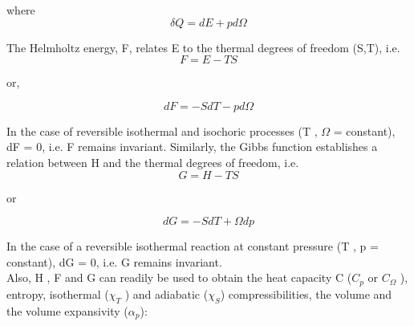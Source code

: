 \documentclass[12pt]{article}
\newcommand*{\1}{\hspace{1pt}}
\begin{document}
    where       \begin{equation*}
                    \delta Q = dE + pd \Omega
                \end{equation*}

    The Helmholtz energy, F, relates E to the thermal degrees of freedom (S,T), i.e.\\

                \begin{equation}
                    F = E - TS
                \end{equation}

    or,

                \begin{equation}
                    dF = -SdT - pd \Omega
                \end{equation}

    In the case of reversible isothermal and isochoric processes (T , $\Omega$ = constant),
    dF = 0, i.e.
    F remains invariant.
        Similarly, the Gibbs function establishes a relation between H and the thermal degrees
    of freedom, i.e.\\

                \begin{equation}
                G = H - TS
                \end{equation}

or

                \begin{equation}
                dG = -S dT + \Omega dp
                \end{equation}

    In the case of a reversible isothermal reaction at constant pressure (T , p = constant),
    dG = 0, i.e. G remains invariant.\\

        Also, H , F and G can readily be used to obtain the heat capacity C ($C_{p}$ or $C_{\Omega}$ ),
    entropy, isothermal ($\chi _{T}$ ) and adiabatic ($\chi _{S}$) compressibilities, the volume and the volume
    expansivity ($\alpha  _{p}$):\\
\end{document}
